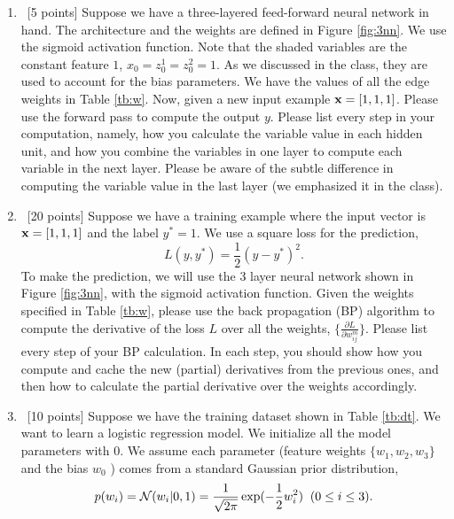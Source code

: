 \documentclass[12pt, fullpage,letterpaper]{article}
\begin{document}
\begin{enumerate}
	\item~[5 points] Suppose we have a three-layered feed-forward neural network in hand. The architecture and the weights are defined in Figure \ref{fig:3nn}. We use the sigmoid activation function. Note that the shaded variables are the constant feature $1$, \ie $x_0 = z_{0}^1 = z_{0}^2 = 1$. As we discussed in the class, they are used to account for the bias parameters. 
	We have the values of all the edge weights in Table \ref{tb:w}. Now, given a new input example ${\bf x}=[1, 1, 1]$. Please use the forward pass to compute the output $y$. Please list every step in your computation, namely, how you calculate the variable value in each hidden unit, and how  you combine the variables in one layer to compute each variable in the next layer. Please be aware of the subtle difference in computing the variable value in the last layer (we emphasized it in the class). 
	
	
	\item~[20 points] Suppose we have a training example  where the input vector is ${\bf x} = [1,1,1]$ and the label $y^* = 1$. We use a square loss for the prediction, 
	\[
	L(y, y^*) = \frac{1}{2}(y-y^*)^2.
	\]
	To make the prediction, we will use the 3 layer neural network shown in Figure \ref{fig:3nn}, with the sigmoid activation function. Given the weights specified in Table \ref{tb:w}, please use the back propagation (BP) algorithm to compute the derivative of the loss $L$ over all the weights, $\{\frac{\partial L}{\partial w^{m}_{ij}}\}$. Please list every step of your BP calculation. In each step, you should show how you compute and cache the new (partial) derivatives from the previous ones, and then how to calculate the partial derivative over the weights accordingly.  
	
	
	
	\item~[10 points] Suppose we have the training dataset shown in Table \ref{tb:dt}. We want to learn a logistic regression model. We initialize all the model parameters with $0$.  We assume each parameter (\ie feature weights $\{w_1, w_2, w_3\}$ and the bias $w_0$ ) comes from a standard Gaussian prior distribution, 
	\[
	p(w_i) = \mathcal{N}(w_i|0,1) = \frac{1}{\sqrt{2\pi}}\exp(-\frac{1}{2}w_i^2)\;\;(0\le i\le 3).
	\]
	

\end{enumerate}
\end{document}
